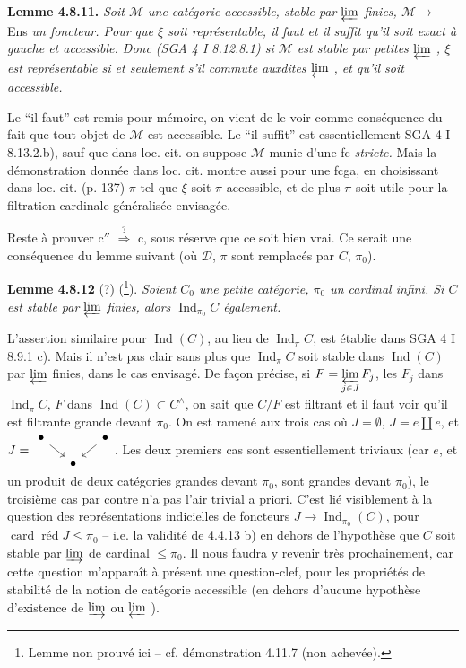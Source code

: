 \documentclass[11pt]{article}
\newcommand{\printedpage}[1]{\marginpar{\footnotesize p.~#1}}
\newcommand{\msp}[1]{\marginpar{\footnotesize [#1]}}
\newcommand{\Ind}{\operatorname{Ind}}
\newcommand{\card}{\operatorname{card}}
\newcommand{\red}{\operatorname{\text{réd}}}
\newcommand{\cM}{\mathcal{M}}
\newcommand{\cD}{\mathcal{D}}
\begin{document}
\textbf{Lemme 4.8.11.} \textit{Soit $\cM$ une catégorie accessible, stable par $\varprojlim$ finies, $\cM \longrightarrow$} Ens \textit{un foncteur. Pour que $\xi$ soit représentable, il faut et il suffit qu'il soit exact à gauche et accessible. Donc (SGA 4 I 8.12.8.1) si $\cM$ est stable par petites $\varprojlim$ , $\xi$ est représentable si et seulement s'il commute auxdites $\varprojlim$ , et qu'il soit accessible.}


\printedpage{75}

\msp{page 211}

Le ``il faut'' est remis pour mémoire, on vient de le voir comme conséquence du fait que tout objet de $\cM$ est accessible. Le ``il suffit'' est essentiellement SGA 4 I 8.13.2.b), sauf que dans loc. cit. on suppose $\cM$ munie d'une fc \textit{stricte.} Mais la démonstration donnée dans loc. cit. montre aussi pour une fcga, en choisissant dans loc. cit. (p. 137) $\pi$ tel que $\xi$ soit $\pi$-accessible, et de plus $\pi$ soit utile pour la filtration cardinale généralisée envisagée.

Reste à prouver c$''$ $\overset{?}{\Longrightarrow}$ c, sous réserve que ce soit bien vrai. Ce serait une conséquence du lemme suivant (où $\cD$, $\pi$ sont remplacés par $C$, $\pi_0$).

\textbf{Lemme 4.8.12} (?) (\footnote[88]{Lemme non prouvé ici -- cf. démonstration 4.11.7 (non achevée).}). \textit{Soient $C_0$ une petite catégorie, $\pi_0$ un cardinal infini. Si $C$ est stable par $\varprojlim$ finies, alors $\Ind_{\pi_0}C$ également.} %

L'assertion similaire pour $\Ind(C)$, au lieu de $\Ind_{\pi}C$, est établie dans SGA 4 I 8.9.1 c). Mais il n'est pas clair sans plus que $\Ind_{\pi}C$ soit stable dans $\Ind(C)$ par $\varprojlim$ finies, dans le cas envisagé. De façon précise, si $F = \varprojlim\limits_{j\in J} F_j$, les $F_j$ dans $\Ind_{\pi}C$,
\msp{page 212}
$F$ dans $\Ind(C) \subset C^{\wedge}$, on sait que $C/F$ est filtrant et il faut voir qu'il est filtrante grande devant $\pi_0$. On est ramené aux trois cas où $J = \emptyset$, $J = e \amalg e$, et $J = \vcenter{\hbox{\begin{tikzcd}[ampersand replacement=\&, column sep=small, row sep=small]
\bullet \arrow[dr] \& \& \bullet \arrow[dl] \\
\& \bullet \&
\end{tikzcd}}}$. Les deux premiers cas sont essentiellement triviaux (car $e$, et un produit de deux catégories grandes devant $\pi_0$, sont grandes devant $\pi_0$), le troisième cas par contre n'a pas l'air trivial a priori. C'est lié visiblement à la question des représentations indicielles de foncteurs $J \longrightarrow \Ind_{\pi_0}(C)$, pour $\card\red J \leqslant \pi_0$ -- i.e. la validité de 4.4.13 b) en dehors de l'hypothèse que $C$ soit stable par $\varinjlim$ de cardinal $\leqslant \pi_0$. Il nous faudra y revenir très prochainement, car cette question m'apparaît à présent une question-clef, pour les propriétés de stabilité de la notion de catégorie accessible (en dehors d'aucune hypothèse d'existence de $\varinjlim$ ou $\varprojlim$ ). %
\end{document}
